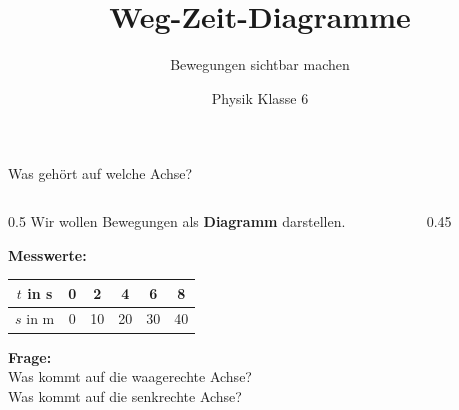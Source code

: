 \documentclass[aspectratio=169,11pt]{beamer}
\title{\textbf{Weg-Zeit-Diagramme}}
\subtitle{Bewegungen sichtbar machen}
\author{Physik Klasse 6}
\date{}
\begin{document}
\begin{frame}
    \titlepage
\end{frame}


\begin{frame}{Was gehört auf welche Achse?}
    \begin{columns}
        \begin{column}{0.5\textwidth}
            Wir wollen Bewegungen als \textbf{Diagramm} darstellen.

            \vspace{0.8em}
            \textbf{Messwerte:}
            \begin{tabular}{|c|c|c|c|c|c|}
                \hline
                $t$ in s & 0 & 2 & 4 & 6 & 8 \\
                \hline
                $s$ in m & 0 & 10 & 20 & 30 & 40 \\
                \hline
            \end{tabular}

            \vspace{1em}
            \textbf{Frage:}\\
            Was kommt auf die waagerechte Achse?\\
            Was kommt auf die senkrechte Achse?
        \end{column}
        \begin{column}{0.45\textwidth}
        \end{column}
    \end{columns}
\end{frame}
\end{document}
